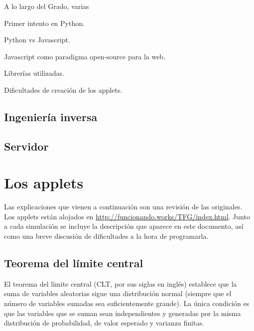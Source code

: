 \documentclass[11pt, a4paper]{article} %
\theoremstyle{named}
\begin{document}
A lo largo del Grado, varias

Primer intento en Python.

Python vs Javascript.

Javascript como paradigma open-source para la web.

Librerías utilizadas.

Dificultades de creación de los applets.

\subsection{Ingeniería inversa}\label{sec:inversa}

\subsection{Servidor}

\newpage

\section{Los applets}\label{sec:apps}


Las explicaciones que vienen a continuación son una revisión de las originales. Los applets están alojados en \url{http://funcionando.works/TFG/index.html}.
Junto a cada simulación se incluye la descripción que aparece en este documento, así como una breve discusión de dificultades a la hora de programarla.
\subsection{Teorema del límite central}\label{sec:central}

El teorema del límite central (CLT, por sus siglas en inglés) establece que la suma de variables aleatorias sigue una distribución normal (siempre que el número de variables sumadas sea suficientemente grande). La única condición es que las variables que se suman sean independientes y generadas por la misma distribución de probabilidad, de valor esperado y varianza finitas.
\end{document}
